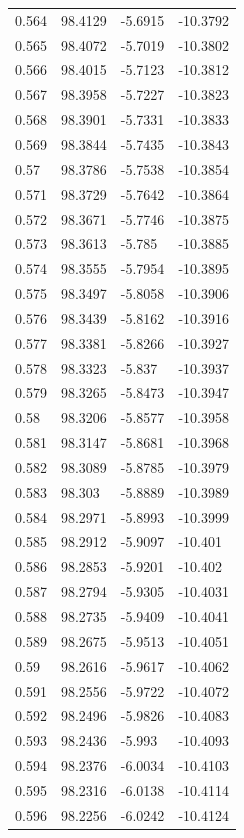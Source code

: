 \begin{tabular}{llll}
0.564 & 98.4129 & -5.6915 & -10.3792 \\
0.565 & 98.4072 & -5.7019 & -10.3802 \\
0.566 & 98.4015 & -5.7123 & -10.3812 \\
0.567 & 98.3958 & -5.7227 & -10.3823 \\
0.568 & 98.3901 & -5.7331 & -10.3833 \\
0.569 & 98.3844 & -5.7435 & -10.3843 \\
0.57 & 98.3786 & -5.7538 & -10.3854 \\
0.571 & 98.3729 & -5.7642 & -10.3864 \\
0.572 & 98.3671 & -5.7746 & -10.3875 \\
0.573 & 98.3613 & -5.785 & -10.3885 \\
0.574 & 98.3555 & -5.7954 & -10.3895 \\
0.575 & 98.3497 & -5.8058 & -10.3906 \\
0.576 & 98.3439 & -5.8162 & -10.3916 \\
0.577 & 98.3381 & -5.8266 & -10.3927 \\
0.578 & 98.3323 & -5.837 & -10.3937 \\
0.579 & 98.3265 & -5.8473 & -10.3947 \\
0.58 & 98.3206 & -5.8577 & -10.3958 \\
0.581 & 98.3147 & -5.8681 & -10.3968 \\
0.582 & 98.3089 & -5.8785 & -10.3979 \\
0.583 & 98.303 & -5.8889 & -10.3989 \\
0.584 & 98.2971 & -5.8993 & -10.3999 \\
0.585 & 98.2912 & -5.9097 & -10.401 \\
0.586 & 98.2853 & -5.9201 & -10.402 \\
0.587 & 98.2794 & -5.9305 & -10.4031 \\
0.588 & 98.2735 & -5.9409 & -10.4041 \\
0.589 & 98.2675 & -5.9513 & -10.4051 \\
0.59 & 98.2616 & -5.9617 & -10.4062 \\
0.591 & 98.2556 & -5.9722 & -10.4072 \\
0.592 & 98.2496 & -5.9826 & -10.4083 \\
0.593 & 98.2436 & -5.993 & -10.4093 \\
0.594 & 98.2376 & -6.0034 & -10.4103 \\
0.595 & 98.2316 & -6.0138 & -10.4114 \\
0.596 & 98.2256 & -6.0242 & -10.4124 \\

\end{tabular}
